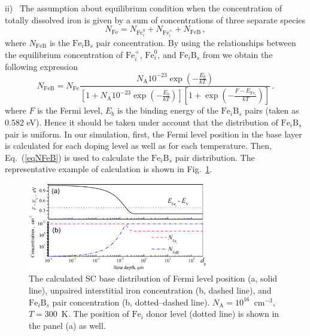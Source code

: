 \documentclass [sort&compress] {elsarticle}
\begin{document}
\noindent
ii)~
The assumption about equilibrium condition when the concentration  of totally dissolved iron is given by a sum of concentrations of three separate species
\begin{equation}
\label{eqN2}
    N_{\mathrm{Fe}}=N_{\mathrm{Fe}_i^0}+N_{\mathrm{Fe}_i^+}+N_{\mathrm{FeB}} \,,
\end{equation}
where
$N_\mathrm{FeB}$ is the $\mathrm{Fe}_i\mathrm{B}_s$ pair concentration.
By using the relationships between the equilibrium concentration of $\mathrm{Fe}_i^+$, $\mathrm{Fe}_i^0$, and  $\mathrm{Fe}_i\mathrm{B}_s$ from \cite{MurphyJAP2011,FeB:kinetic}
we obtain the following expression
\begin{equation}
\label{eqNFeB}
    N_{\mathrm{FeB}}=N_{\mathrm{Fe}}\frac{N_\mathrm{A}10^{-23}\exp\left(-\frac{E_b}{kT}\right)}
     {\left[1+N_\mathrm{A}10^{-23}\exp\left(-\frac{E_b}{kT}\right)\right]\left[1+\exp\left(-\frac{F-E_{\mathrm{Fe}_i}}{kT}\right)\right]}\,.
\end{equation}
where
$F$ is the Fermi level,
$E_b$ is the binding energy of the $\mathrm{Fe}_i\mathrm{B}_s$ pairs (taken as 0.582 eV).
Hence it should be taken under account that the distribution of $\mathrm{Fe}_i\mathrm{B}_s$ pair is uniform.
In our simulation, first, the Fermi level position in the base layer is calculated for each doping level as well as for each temperature.
Then, Eq.~(\ref{eqNFeB}) is used to calculate the $\mathrm{Fe}_i\mathrm{B}_s$ pair distribution.
The representative example of calculation is shown in Fig.~\ref{figDist}.

\begin{figure}
\includegraphics[width=0.7\textwidth]{Fig2}%
\caption{\label{figDist}
The calculated SC base distribution of Fermi level position (a, solid line), unpaired interstitial iron concentration (b, dashed line),
and $\mathrm{Fe}_i\mathrm{B}_s$ pair concentration (b, dotted--dashed line).
$N_\mathrm{A}=10^{16}$~cm$^{-3}$, $T=300$~K.
The position of $\mathrm{Fe}_i$ donor level (dotted line) is shown in the panel (a) as well.
}%
\end{figure}
\end{document}
